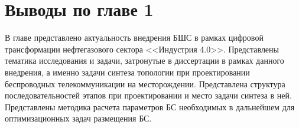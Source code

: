 \section{Выводы по главе 1}

В главе представлено актуальность внедрения БШС в рамках цифровой трансформации нефтегазового сектора <<Индустрия 4.0>>. Представлены тематика исследования и задачи, затронутые в диссертации в рамках данного внедрения, а именно задачи синтеза топологии при проектировании беспроводных телекоммуникации на месторождении. Представлена структура последовательностей этапов при проектировании и место задачи синтеза в ней. Представлены методика расчета параметров БС необходимых в дальнейшем для оптимизационных задач размещения БС. 






\FloatBarrier

